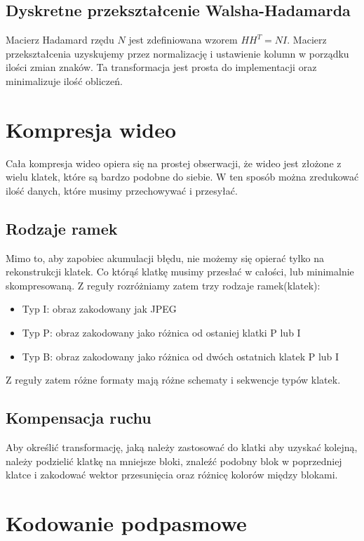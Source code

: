 \documentclass{../notatki}
\begin{document}
\subsection{Dyskretne przekształcenie Walsha-Hadamarda}

Macierz Hadamard rzędu $N$ jest zdefiniowana wzorem $HH^T = NI$. Macierz
przekształcenia uzyskujemy przez normalizację i ustawienie kolumn w porządku
ilości zmian znaków. Ta transformacja jest prosta do implementacji oraz
minimalizuje ilość obliczeń.

\section{Kompresja wideo}

Cała kompresja wideo opiera się na prostej obserwacji, że wideo jest
złożone z wielu klatek, które są bardzo podobne do siebie. W ten sposób
można zredukować ilość danych, które musimy przechowywać i przesyłać.

\subsection{Rodzaje ramek}

Mimo to, aby zapobiec akumulacji błędu, nie możemy się opierać tylko na
rekonstrukcji klatek. Co którąś klatkę musimy przesłać w całości, lub
minimalnie skompresowaną. Z reguły rozróżniamy zatem trzy rodzaje ramek(klatek):
\begin{itemize}
\item Typ I: obraz zakodowany jak JPEG
\item Typ P: obraz zakodowany jako różnica od ostaniej klatki P lub I
\item Typ B: obraz zakodowany jako różnica od dwóch ostatnich klatek P lub I
\end{itemize}
Z reguły zatem różne formaty mają różne schematy i sekwencje typów klatek.

\subsection{Kompensacja ruchu}

Aby określić transformację, jaką należy zastosować do klatki aby
uzyskać kolejną,
należy podzielić klatkę na mniejsze bloki, znaleźć podobny blok w poprzedniej
klatce i zakodować wektor przesunięcia oraz różnicę kolorów między blokami.

\section{Kodowanie podpasmowe}
\end{document}
